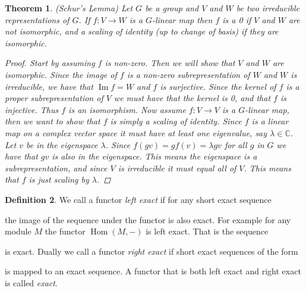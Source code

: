 \documentclass[11pt, a4paper, english]{article}
\newtheorem{theorem}{Theorem}[section]
\theoremstyle{definition}
\newtheorem{defin}[theorem]{Definition}
\newcommand{\C}{\mathbb{C}}
\DeclareMathOperator{\Hom}{Hom}
\DeclareMathOperator{\Image}{Im}
\begin{document}
\begin{appendices}
\begin{theorem}
\label{schur}
(Schur's Lemma) Let $G$ be a group and $V$ and $W$ be two irreducible representations of $G$. If $f:V \to W$ is a $G$-linear map then $f$ is a 0 if $V$ and $W$ are not isomorphic, and a scaling of identity (up to change of basis) if they are isomorphic.
\begin{proof}
Start by assuming $f$ is non-zero. Then we will show that $V$ and $W$ are isomorphic. Since the image of $f$ is a non-zero subrepresentation of $W$ and $W$ is irreducible, we have that $\Image f = W$ and $f$ is surjective. Since the kernel of $f$ is a proper subrepresentation of $V$ we must have that the kernel is 0, and that $f$ is injective. Thus $f$ is an isomorphism.
Now assume $f: V \to V$ is a $G$-linear map, then we want to show that $f$ is simply a scaling of identity. Since $f$ is a linear map on a complex vector space it must have at least one eigenvalue, say $\lambda \in \C$. Let $v$ be in the eigenspace $\lambda$. Since $f(gv) = g f(v) = \lambda gv$ for all $g$ in $G$ we have that $gv$ is also in the eigenspace. This means the eigenspace is a subrepresentation, and since $V$ is irreducible it must equal all of $V$. This means that $f$ is just scaling by $\lambda$.
\end{proof}
\end{theorem}

\begin{defin}
\label{def:exact_functor}
We call a functor \textit{left exact} if for any short exact sequence
\begin{center}
\end{center}
the image of the sequence under the functor is also exact. For example for any module $M$ the functor $\Hom(M, -)$ is left exact. That is the sequence
\begin{center}
\end{center}
is exact. Dually we call a functor \textit{right exact} if short exact sequences of the form
\begin{center}
\end{center}
is mapped to an exact sequence. A functor that is both left exact and right exact is called \textit{exact}.
\end{defin}


\end{appendices}
\end{document}
